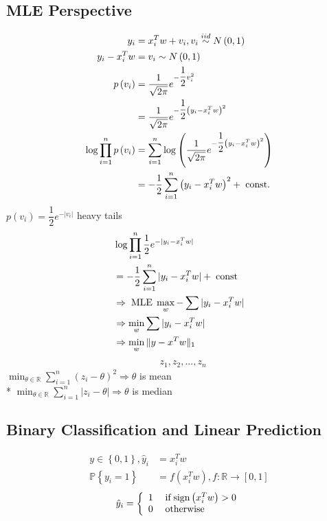 \documentclass{article}
\begin{document}
\subsection{MLE Perspective}
\begin{align*}
y_{i} &= x_{i}^{T} w + v_{i}, v_{i} \stackrel{iid}{\sim} N\left(0, 1\right)
\\ y_{i} - x_{i}^{T} w &= v_{i} \sim  N\left(0, 1\right)
\\ p\left(v_{i}\right)  &= \dfrac{1}{\sqrt{2 \pi}} e^{- \dfrac{1}{2} v_{i}^{2}}
\\ &= \dfrac{1}{\sqrt{2 \pi}} e^{- \dfrac{1}{2} \left(y_{i} - x_{i}^{T} w\right)^{2}}
\\ \log \displaystyle\prod_{i=1}^{n} p\left(v_{i}\right) &= \displaystyle\sum_{i=1}^{n} \log \left(\dfrac{1}{\sqrt{2 \pi}} e^{- \dfrac{1}{2} \left(y_{i} - x_{i}^{T} w\right)^{2}}\right)
\\ &= - \dfrac{1}{2} \displaystyle\sum_{i=1}^{n} \left(y_{i} - x_{i}^{T} w\right)^{2} + \text{\;const.\;}
\end{align*}
$p\left(v_{i}\right)  = \dfrac{1}{2} e^{- |v_{i}|}$ heavy tails
\begin{align*}
&  \log \displaystyle\prod_{i=1}^{n} \dfrac{1}{2} e^{- |y_{i} - x_{i}^{T} w|}
\\ &= - \dfrac{1}{2} \displaystyle\sum_{i=1}^{n} |y_{i} - x_{i}^{T} w| + \text{\;const\;}
\\ &\Rightarrow  \text{\;MLE\;} \displaystyle\max_{w} - \displaystyle\sum |y_{i} - x_{i}^{T} w|
\\ &\Rightarrow  \displaystyle\min_{w} \displaystyle\sum | y_{i} - x_{i}^{T} w |
\\ &\Rightarrow  \displaystyle\min_{w} \| y - x^{T} w \|_{1}
\end{align*}
\begin{align*}
&z_{1}, z_{2}, ..., z_{n}
\end{align*}
$\displaystyle\min_{\theta \in \mathbb{R}} \displaystyle\sum_{i=1}^{n} \left(z_{i} - \theta\right)^{2} \Rightarrow  \theta$ is mean
\\* $\displaystyle\min_{\theta \in \mathbb{R}} \displaystyle\sum_{i=1}^{n} |z_{i} - \theta| \Rightarrow  \theta$ is median



\subsection{Binary Classification and Linear Prediction}
\begin{align*}
y  \in \left\{0, 1\right\}, \hat{y}_{i} &= x_{i}^{T} w 
\\ \mathbb{P}\left\{y_{i} = 1\right\} &= f\left(x_{i}^{T} w\right), f : \mathbb{R} \to  \left[0, 1\right]
\end{align*}
\[ \hat{y}_{i} =\left\{ \begin{array}{ll}
1& \text{\;if\;} \text{sign}\left(x_{i}^{T} w\right) > 0 \\
0& \text{\;otherwise\;} \\
\end{array}\right. \]
\end{document}
